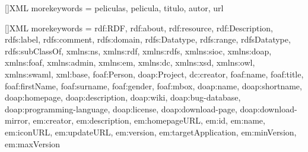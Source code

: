 {
}

\headheight 15pt

\let\OLDthebibliography=\thebibliography
\def\thebibliography#1{\OLDthebibliography{#1}%
	\addcontentsline{toc}{chapter}{\bibname}}

\renewcommand{\tablename}{Tabla}
\renewcommand{\listtablename}{Indice de tablas}



[]{XML}{%
	morekeywords = {peliculas, pelicula, titulo, autor, url }
}

[]{XML}{%
	morekeywords = {rdf:RDF, rdf:about, rdf:resource, rdf:Description,
			rdfs:label, rdfs:comment, rdfs:domain, rdfs:Datatype,
			rdfs:range, rdfsDatatype, rdfs:subClassOf,
			xmlns:ns, xmlns:rdf, xmlns:rdfs, xmlns:sioc, 
			xmlns:doap, xmlns:foaf, xmlns:admin, xmlns:em, 
			xmlns:dc, xmlns:xsd, xmlns:owl, xmlns:swaml, 
			xml:base, foaf:Person, doap:Project, dc:creator,
			foaf:name, foaf:title, foaf:firstName,
			foaf:surname, foaf:gender, foaf:mbox,
			doap:name, doap:shortname, doap:homepage,
			doap:description, doap:wiki, doap:bug-database,
			doap:programming-language, doap:license,
			doap:download-page, doap:download-mirror,
			em:creator, em:description, em:homepageURL,
			em:id, em:name, em:iconURL, em:updateURL,
			em:version, em:targetApplication, em:minVersion,
			em:maxVersion
	}
}

